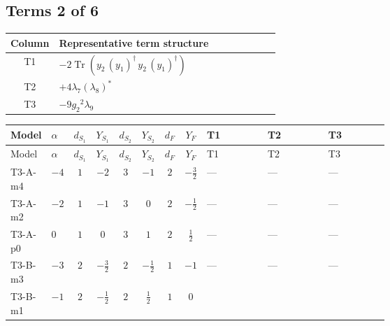 \documentclass[8pt]{article}
\begin{document}
\begin{landscape}
\subsection*{Terms 2 of 6}
\begin{center}
\begin{tabular}{@{}c >{\raggedright\arraybackslash}p{0.82\linewidth}@{}}
\toprule
Column & Representative term structure \\
\midrule
T1 & \(\displaystyle -2 \operatorname{Tr}\!\left({y_2}\,\left({y_1}\right)^{\dagger}\,{y_2}\,\left({y_1}\right)^{\dagger}\right)\) \\
\midrule
T2 & \(\displaystyle +4 {\lambda_{7}} \left({\lambda_{8}}\right)^{*}\) \\
\midrule
T3 & \(\displaystyle -9 {g_2}^2 {\lambda_{9}}\) \\
\midrule
\bottomrule
\end{tabular}
\end{center}
\smallskip
\tiny
\begin{longtable}{@{}llcccccc >{\raggedright\arraybackslash}p{0.21\linewidth} >{\raggedright\arraybackslash}p{0.21\linewidth} >{\raggedright\arraybackslash}p{0.21\linewidth}@{}}
\toprule
Model & $\alpha$ & $d_{S_1}$ & $Y_{S_1}$ & $d_{S_2}$ & $Y_{S_2}$ & $d_F$ & $Y_F$ & T1 & T2 & T3 \\
\midrule
\endfirsthead
\toprule
Model & $\alpha$ & $d_{S_1}$ & $Y_{S_1}$ & $d_{S_2}$ & $Y_{S_2}$ & $d_F$ & $Y_F$ & T1 & T2 & T3 \\
\midrule
\endhead
T3-A-m4 & $-4$ & $1$ & $-2$ & $3$ & $-1$ & $2$ & $-\frac{3}{2}$ & --- & --- & --- \\
\midrule
T3-A-m2 & $-2$ & $1$ & $-1$ & $3$ & $0$ & $2$ & $-\frac{1}{2}$ & --- & --- & --- \\
\midrule
T3-A-p0 & $0$ & $1$ & $0$ & $3$ & $1$ & $2$ & $\frac{1}{2}$ & --- & --- & --- \\
\midrule
T3-B-m3 & $-3$ & $2$ & $-\frac{3}{2}$ & $2$ & $-\frac{1}{2}$ & $1$ & $-1$ & --- & --- & --- \\
\midrule
T3-B-m1 & $-1$ & $2$ & $-\frac{1}{2}$ & $2$ & $\frac{1}{2}$ & $1$ & $0$ & \scriptsize\adjustbox{max width=\linewidth}{$\begin{gathered} -2 \operatorname{Tr}\!\left({y_2}\,\left({y_1}\right)^{\dagger}\,{y_2}\,\left({y_1}\right)^{\dagger}\right)\end{gathered}$} & \scriptsize\adjustbox{max width=\linewidth}{$\begin{gathered} +4 {\lambda_{7}} \left({\lambda_{8}}\right)^{*}\end{gathered}$} & \scriptsize\adjustbox{max width=\linewidth}{$\begin{gathered} -9 {g_2}^2 {\lambda_{9}}\end{gathered}$} \\

\end{longtable}
\end{landscape}
\end{document}

